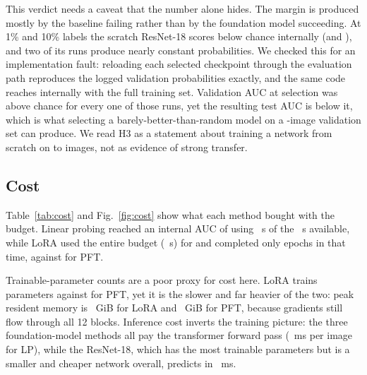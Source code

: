\documentclass[conference,a4paper]{IEEEtran}
\begin{document}
This verdict needs a caveat that the number alone hides. The margin is produced
mostly by the baseline failing rather than by the foundation model succeeding.
At 1\% and 10\% labels the scratch ResNet-18 scores below chance internally
(\valMainCNNOneAucIn and \valMainCNNTenAucIn), and two of its runs produce
nearly constant probabilities. We checked this for an implementation fault:
reloading each selected checkpoint through the evaluation path reproduces the
logged validation probabilities exactly, and the same code reaches
\valMainCNNHundredAucIn internally with the full training set. Validation AUC at
selection was above chance for every one of those runs, yet the resulting test
AUC is below it, which is what selecting a barely-better-than-random model on a
\valDataBusiVal-image validation set can produce. We read H3 as a statement
about training a network
from scratch on \valDataSubsetOneN to \valDataSubsetTenN images, not as evidence
of strong transfer.

\begin{table}[!t]
\caption{Cost at the fixed budget, mean $\pm$ SD over three seeds. Charged time
includes the cold feature-extraction cost for LP. ``Cap hit'' counts runs
stopped by the \valProtocolCapSeconds~s deadline.}
\label{tab:cost}
\centering

\end{table}

\subsection{Cost}

Table~\ref{tab:cost} and Fig.~\ref{fig:cost} show what each method bought with
the budget. Linear probing reached an internal AUC of
\valMainLPHundredAucInMean using \valCostLPHundredTime~s of the
\valProtocolCapSeconds~s available, while LoRA used the entire budget
(\valCostLoRAHundredTime~s) for \valMainLoRAHundredAucInMean and completed only
\valCostLoRAHundredEpochs epochs in that time, against
\valCostPFTHundredEpochs for PFT.

Trainable-parameter counts are a poor proxy for cost here. LoRA trains
\valParamsLoRA parameters against \valParamsPFT for PFT, yet it is the slower
and far heavier of the two: peak resident memory is \valCostLoRAHundredRss~GiB
for LoRA and \valCostPFTHundredRss~GiB for PFT, because gradients still flow
through all 12 blocks. Inference cost inverts the training picture: the three
foundation-model methods all pay the transformer forward pass
(\valCostLPHundredInference~ms per image for LP), while the ResNet-18, which has
the most trainable parameters but is a smaller and cheaper network overall,
predicts in \valCostCNNHundredInference~ms.
\end{document}
